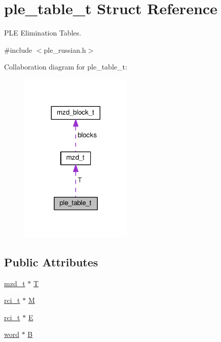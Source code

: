\hypertarget{structple__table__t}{}\section{ple\+\_\+table\+\_\+t Struct Reference}
\label{structple__table__t}


P\+L\+E Elimination Tables.  




{\ttfamily \#include $<$ple\+\_\+russian.\+h$>$}



Collaboration diagram for ple\+\_\+table\+\_\+t\+:
\nopagebreak
\begin{figure}[H]
\begin{center}
\leavevmode
\includegraphics[width=152pt]{structple__table__t__coll__graph}
\end{center}
\end{figure}
\subsection*{Public Attributes}
\begin{DoxyCompactItemize}
\item 
\hyperlink{structmzd__t}{mzd\+\_\+t} $\ast$ \hyperlink{structple__table__t_a225464f42780520a354003a52d5f05eb}{T}
\item 
\hyperlink{misc_8h_a03971b7935a6bc6fb77e74988850a136}{rci\+\_\+t} $\ast$ \hyperlink{structple__table__t_aa881f8cb4df5b51730030f1fe1aef595}{M}
\item 
\hyperlink{misc_8h_a03971b7935a6bc6fb77e74988850a136}{rci\+\_\+t} $\ast$ \hyperlink{structple__table__t_a5e6734cb14c95bf9eead28ce33a44d73}{E}
\item 
\hyperlink{misc_8h_a8829cde3436decd2d2c3d99ed7d649f1}{word} $\ast$ \hyperlink{structple__table__t_a97a0cf126ad6f93e15b59233f8e60604}{B}
\end{DoxyCompactItemize}



